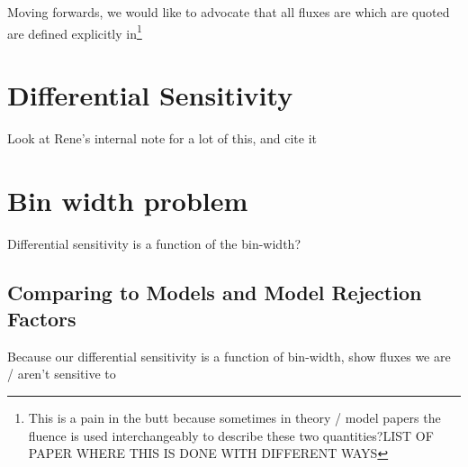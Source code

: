 \documentclass[a4paper,11pt]{article}
\begin{document}
Moving forwards, we would like to advocate that all fluxes are which are quoted are defined explicitly in\footnote{This is a pain in the butt because sometimes in theory / model papers the fluence is used interchangeably to describe these two quantities?LIST OF PAPER WHERE THIS IS DONE WITH DIFFERENT WAYS}

\section{Differential Sensitivity}
Look at Rene's internal note for a lot of this, and cite it

\section{Bin width problem}
Differential sensitivity is a function of the bin-width?

\subsection{Comparing to Models and Model Rejection Factors}
Because our differential sensitivity is a function of bin-width, show fluxes we are / aren't sensitive to





\end{document}
